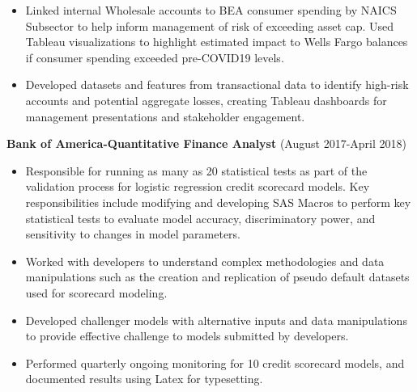 \documentclass[a4paper,10pt]{article}
\begin{document}
\begin{itemize}
\begin{itemize}[label=\textbullet]
  \end{itemize}
\item Linked internal Wholesale accounts to BEA consumer spending by NAICS Subsector to help inform management of risk of exceeding asset cap. Used Tableau visualizations to highlight estimated impact to Wells Fargo balances if consumer spending exceeded pre-COVID19 levels.
\item Developed datasets and features from transactional data to identify high-risk accounts and potential aggregate losses, creating Tableau dashboards for management presentations and stakeholder engagement.
\end{itemize}

\noindent
\textbf{Bank of America-Quantitative Finance Analyst} (August 2017-April 2018)
\begin{itemize}
\item Responsible for running as many as 20 statistical tests as part of the validation process for logistic regression credit scorecard models.  Key responsibilities include modifying and developing SAS Macros to perform key statistical tests to evaluate model accuracy, discriminatory power, and sensitivity to changes in model parameters.  
\item Worked with developers to understand complex methodologies and data manipulations such as the creation and replication of pseudo default datasets used for scorecard modeling.
\item Developed challenger models with alternative inputs and data manipulations to provide effective challenge to models submitted by developers.
\item Performed quarterly ongoing monitoring for 10 credit scorecard models, and documented results using Latex for typesetting.
\end{itemize}
\end{document}
